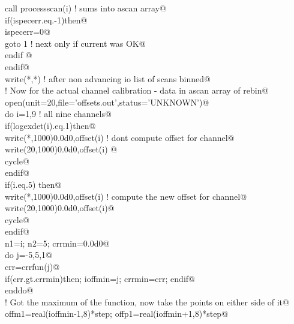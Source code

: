 \documentclass[10pt,a4paper,notitlepage]{article}
\begin{document}
\begin{flushleft}
\begin{list}{}{}
\mbox{}\verb@        call processscan(i)                       ! sums into ascan array@\\
\mbox{}\verb@        if(ispecerr.eq.-1)then@\\
\mbox{}\verb@           ispecerr=0@\\
\mbox{}\verb@           goto 1            ! next only if current was OK@\\
\mbox{}\verb@        endif   @\\
\mbox{}\verb@      endif@\\
\mbox{}\verb@      write(*,*) ! after non advancing io list of scans binned@\\
\mbox{}\verb@! Now for the actual channel calibration - data in ascan array of rebin@\\
\mbox{}\verb@      open(unit=20,file='offsets.out',status='UNKNOWN')@\\
\mbox{}\verb@      do i=1,9 ! all nine channels@\\
\mbox{}\verb@         if(logexdet(i).eq.1)then@\\
\mbox{}\verb@           write(*,1000)0.0d0,offset(i)  ! dont compute offset for channel@\\
\mbox{}\verb@           write(20,1000)0.0d0,offset(i)         @\\
\mbox{}\verb@          cycle@\\
\mbox{}\verb@         endif@\\
\mbox{}\verb@         if(i.eq.5) then@\\
\mbox{}\verb@           write(*,1000)0.0d0,offset(i)  ! compute the new offset for channel@\\
\mbox{}\verb@           write(20,1000)0.0d0,offset(i)@\\
\mbox{}\verb@           cycle@\\
\mbox{}\verb@         endif@\\
\mbox{}\verb@         n1=i; n2=5; crrmin=0.0d0@\\
\mbox{}\verb@         do j=-5,5,1@\\
\mbox{}\verb@           crr=crrfun(j)@\\
\mbox{}\verb@           if(crr.gt.crrmin)then; ioffmin=j; crrmin=crr; endif@\\
\mbox{}\verb@         enddo@\\
\mbox{}\verb@! Got the maximum of the function, now take the points on either side of it@\\
\mbox{}\verb@       offm1=real(ioffmin-1,8)*step; offp1=real(ioffmin+1,8)*step@\\

\end{list}
\end{flushleft}
\end{document}
